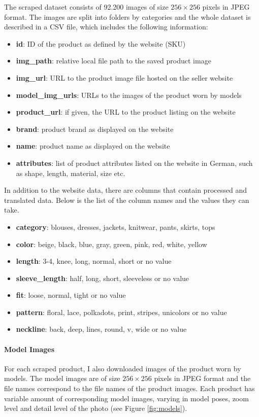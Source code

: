 \documentclass[12pt]{report}
\begin{document}
The scraped dataset consists of 92.200 images of size $256\times256$ pixels in JPEG format. The images are split into folders by categories and the whole dataset is described in a CSV file, which includes the following information:
\begin{itemize}
\item \textbf{id}: ID of the product as defined by the website (SKU)
\item \textbf{img\_path}: relative local file path to the saved product image
\item \textbf{img\_url}: URL to the product image file hosted on the seller website
\item \textbf{model\_img\_urls}: URLs to the images of the product worn by models
\item \textbf{product\_url}: if given, the URL to the product listing on the website
\item \textbf{brand}: product brand as displayed on the website
\item \textbf{name}: product name as displayed on the website
\item \textbf{attributes}: list of product attributes listed on the website in German, such as shape, length, material, size etc.
\end{itemize}

In addition to the website data, there are columns that contain processed and translated data. Below is the list of the column names and the values they can take.
\begin{itemize}
\item \textbf{category}: blouses, dresses, jackets, knitwear, pants, skirts, tops
\item \textbf{color}: beige, black, blue, gray, green, pink, red, white, yellow
\item \textbf{length}: 3-4, knee, long, normal, short or no value
\item \textbf{sleeve\_length}: half, long, short, sleeveless or no value
\item \textbf{fit}: loose, normal, tight or no value
\item \textbf{pattern}: floral, lace, polkadots, print, stripes, unicolors or no value
\item \textbf{neckline}: back, deep, lines, round, v, wide or no value
\end{itemize}

\paragraph{Model Images}
For each scraped product, I also downloaded images of the product worn by models. The model images are of size $256\times256$ pixels in JPEG format and the file names correspond to the file names of the product images. Each product has variable amount of corresponding model images, varying in model poses, zoom level and detail level of the photo (see Figure \ref{fig:models}).
\end{document}
